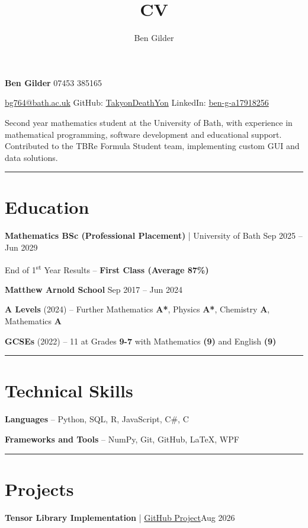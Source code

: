 \documentclass[11pt, a4paper]{article}
\author{Ben Gilder}
\title{CV}
\newcommand{\cvline}{\vspace{-4pt}\noindent\rule{\linewidth}{0.5pt}\vspace{-8pt}}
\begin{document}
{\Huge{\textbf{Ben Gilder}}} \hfill 07453 385165
\begin{center}
\href{mailto:bg764@bath.ac.uk}{bg764@bath.ac.uk} \hfill	
GitHub: \href{https://github.com/TakyonDeathYon}{TakyonDeathYon} \hfill 
LinkedIn: \href{https://linkedin.com/in/ben-g-a17918256}{ben-g-a17918256}
\end{center}
Second year mathematics student at the University of Bath, 
with experience in mathematical programming, software development 
and educational support. Contributed to the TBRe Formula 
Student team, implementing custom GUI and data solutions. 

\cvline
\section{Education}
{\large\textbf{Mathematics BSc (Professional Placement)} | University of Bath \hfill	Sep 2025 – Jun 2029}
\vspace{2pt}

End of 1\textsuperscript{st} Year Results – \textbf{First Class (Average 87\%)}

\vspace{2pt}
{\large\textbf{Matthew Arnold School}	\hfill Sep 2017 – Jun 2024}
\vspace{2pt}

\textbf{A Levels} (2024) – Further Mathematics \textbf{A*}, Physics \textbf{A*}, Chemistry \textbf{A}, Mathematics \textbf{A} 

\textbf{GCSEs} (2022) – 11 at Grades \textbf{9-7} with Mathematics \textbf{(9)} and English \textbf{(9)}

\cvline 
\section{Technical Skills}
{\large
\textbf{Languages} – Python, SQL, R, JavaScript, C\#, C

\vspace{2pt}

\textbf{Frameworks and Tools} – NumPy, Git, GitHub, LaTeX, WPF
}

\cvline
\section{Projects}

\vspace{2pt}
{\large\textbf{Tensor Library Implementation} | \href{https://github.com/TakyonDeathYon/Tensors}{GitHub Project}\hfill Aug 2026}
\vspace{2pt}
\end{document}
